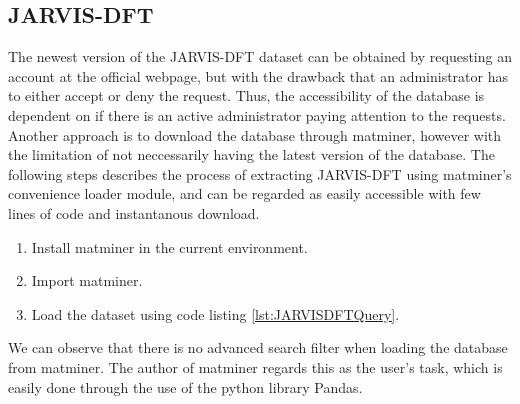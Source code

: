 

\subsection{JARVIS-DFT}

The newest version of the JARVIS-DFT dataset can be obtained by requesting an account at the official webpage, but with the drawback that an administrator has to either accept or deny the request. Thus, the accessibility of the database is dependent on if there is an active administrator paying attention to the requests. Another approach is to download the database through matminer, however with the limitation of not neccessarily having the latest version of the database. The following steps describes the process of extracting JARVIS-DFT using matminer's convenience loader module, and can be regarded as easily accessible with few lines of code and instantanous download.

\begin{enumerate}
  \item Install matminer in the current environment.
  \item Import matminer.
  \item Load the dataset using code listing \ref{lst:JARVISDFTQuery}.
\end{enumerate}


We can observe that there is no advanced search filter when loading the database from matminer. The author of matminer regards this as the user's task, which is easily done through the use of the python library Pandas.
